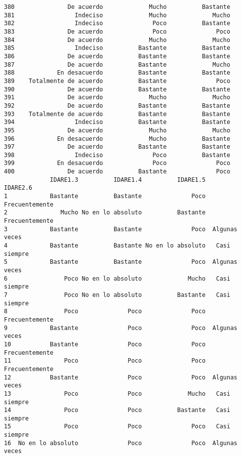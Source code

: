 \documentclass[
  letterpaper,
  DIV=11,
  numbers=noendperiod]{scrartcl}
\begin{document}
\begin{verbatim}
380               De acuerdo             Mucho          Bastante
381                 Indeciso             Mucho             Mucho
382                 Indeciso              Poco          Bastante
383               De acuerdo              Poco              Poco
384               De acuerdo             Mucho             Mucho
385                 Indeciso          Bastante          Bastante
386               De acuerdo          Bastante          Bastante
387               De acuerdo          Bastante             Mucho
388            En desacuerdo          Bastante          Bastante
389    Totalmente de acuerdo          Bastante              Poco
390               De acuerdo          Bastante          Bastante
391               De acuerdo             Mucho             Mucho
392               De acuerdo          Bastante          Bastante
393    Totalmente de acuerdo          Bastante          Bastante
394                 Indeciso          Bastante          Bastante
395               De acuerdo             Mucho             Mucho
396            En desacuerdo             Mucho          Bastante
397               De acuerdo          Bastante          Bastante
398                 Indeciso              Poco          Bastante
399            En desacuerdo              Poco              Poco
400               De acuerdo          Bastante              Poco
             IDARE1.3          IDARE1.4          IDARE1.5       IDARE2.6
1            Bastante          Bastante              Poco Frecuentemente
2               Mucho No en lo absoluto          Bastante Frecuentemente
3            Bastante          Bastante              Poco  Algunas veces
4            Bastante          Bastante No en lo absoluto   Casi siempre
5            Bastante          Bastante              Poco  Algunas veces
6                Poco No en lo absoluto             Mucho   Casi siempre
7                Poco No en lo absoluto          Bastante   Casi siempre
8                Poco              Poco              Poco Frecuentemente
9            Bastante              Poco              Poco  Algunas veces
10           Bastante              Poco              Poco Frecuentemente
11               Poco              Poco              Poco Frecuentemente
12           Bastante              Poco              Poco  Algunas veces
13               Poco              Poco             Mucho   Casi siempre
14               Poco              Poco          Bastante   Casi siempre
15               Poco              Poco              Poco   Casi siempre
16  No en lo absoluto              Poco              Poco  Algunas veces

\end{verbatim}
\end{document}
